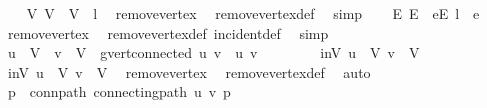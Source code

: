 \begin{isabellebody}
\ \ \isamarkupfalse%
\ V{\isacharprime}{\kern0pt}{\isacharcolon}{\kern0pt}\ {\isachardoublequoteopen}V{\isacharprime}{\kern0pt}\ {\isacharequal}{\kern0pt}\ V\ {\isacharminus}{\kern0pt}\ {\isacharbraceleft}{\kern0pt}l{\isacharbraceright}{\kern0pt}{\isachardoublequoteclose}\ \isamarkupfalse%
\ remove{\isacharunderscore}{\kern0pt}vertex\ \isamarkupfalse%
\ remove{\isacharunderscore}{\kern0pt}vertex{\isacharunderscore}{\kern0pt}def\ \isamarkupfalse%
\ simp\isanewline
\ \ \isamarkupfalse%
\ E{\isacharprime}{\kern0pt}{\isacharcolon}{\kern0pt}\ {\isachardoublequoteopen}E{\isacharprime}{\kern0pt}\ {\isacharequal}{\kern0pt}\ {\isacharbraceleft}{\kern0pt}e{\isasymin}E{\isachardot}{\kern0pt}\ l\ {\isasymnotin}\ e{\isacharbraceright}{\kern0pt}{\isachardoublequoteclose}\ \isamarkupfalse%
\ remove{\isacharunderscore}{\kern0pt}vertex\ \isamarkupfalse%
\ remove{\isacharunderscore}{\kern0pt}vertex{\isacharunderscore}{\kern0pt}def\ incident{\isacharunderscore}{\kern0pt}def\ \isamarkupfalse%
\ simp\isanewline
\ \ \isamarkupfalse%
\ {\isachardoublequoteopen}u\ {\isasymin}\ V{\isacharprime}{\kern0pt}\ {\isasymLongrightarrow}\ v\ {\isasymin}\ V{\isacharprime}{\kern0pt}\ {\isasymLongrightarrow}\ g{\isacharprime}{\kern0pt}{\isachardot}{\kern0pt}vert{\isacharunderscore}{\kern0pt}connected\ u\ v{\isachardoublequoteclose}\ \ u\ v\isanewline
\ \ \isamarkupfalse%
{\isacharminus}{\kern0pt}\isanewline
\ \ \ \ \isamarkupfalse%
\ inV{\isacharprime}{\kern0pt}{\isacharcolon}{\kern0pt}\ {\isachardoublequoteopen}u\ {\isasymin}\ V{\isacharprime}{\kern0pt}{\isachardoublequoteclose}\ {\isachardoublequoteopen}v\ {\isasymin}\ V{\isacharprime}{\kern0pt}{\isachardoublequoteclose}\isanewline
\ \ \ \ \isamarkupfalse%
\ \isamarkupfalse%
\ inV{\isacharcolon}{\kern0pt}\ {\isachardoublequoteopen}u\ {\isasymin}\ V{\isachardoublequoteclose}\ {\isachardoublequoteopen}v\ {\isasymin}\ V{\isachardoublequoteclose}\ \isamarkupfalse%
\ remove{\isacharunderscore}{\kern0pt}vertex\ \isamarkupfalse%
\ remove{\isacharunderscore}{\kern0pt}vertex{\isacharunderscore}{\kern0pt}def\ \isamarkupfalse%
\ auto\isanewline
\ \ \ \ \isamarkupfalse%
\ \isamarkupfalse%
\ p\ \ conn{\isacharunderscore}{\kern0pt}path{\isacharcolon}{\kern0pt}\ {\isachardoublequoteopen}connecting{\isacharunderscore}{\kern0pt}path\ u\ v\ p{\isachardoublequoteclose}\ \isamarkupfalse%

\end{isabellebody}
